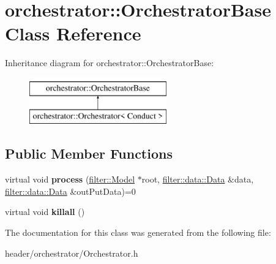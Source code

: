 \hypertarget{classorchestrator_1_1_orchestrator_base}{}\section{orchestrator\+:\+:Orchestrator\+Base Class Reference}
\label{classorchestrator_1_1_orchestrator_base}
Inheritance diagram for orchestrator\+:\+:Orchestrator\+Base\+:\begin{figure}[H]
\begin{center}
\leavevmode
\includegraphics[height=2.000000cm]{d4/de8/classorchestrator_1_1_orchestrator_base}
\end{center}
\end{figure}
\subsection*{Public Member Functions}
\begin{DoxyCompactItemize}
\item 
\mbox{\label{classorchestrator_1_1_orchestrator_base_af9b68f63617627596ca904fc0e9028af}} 
virtual void {\bfseries process} (\hyperlink{classfilter_1_1_model}{filter\+::\+Model} $\ast$root, \hyperlink{classfilter_1_1data_1_1_data}{filter\+::data\+::\+Data} \&data, \hyperlink{classfilter_1_1data_1_1_data}{filter\+::data\+::\+Data} \&out\+Put\+Data)=0
\item 
\mbox{\label{classorchestrator_1_1_orchestrator_base_aa2c3cc08613c03165ff1d18cac4acafe}} 
virtual void {\bfseries killall} ()
\end{DoxyCompactItemize}


The documentation for this class was generated from the following file\+:\begin{DoxyCompactItemize}
\item 
header/orchestrator/Orchestrator.\+h\end{DoxyCompactItemize}
